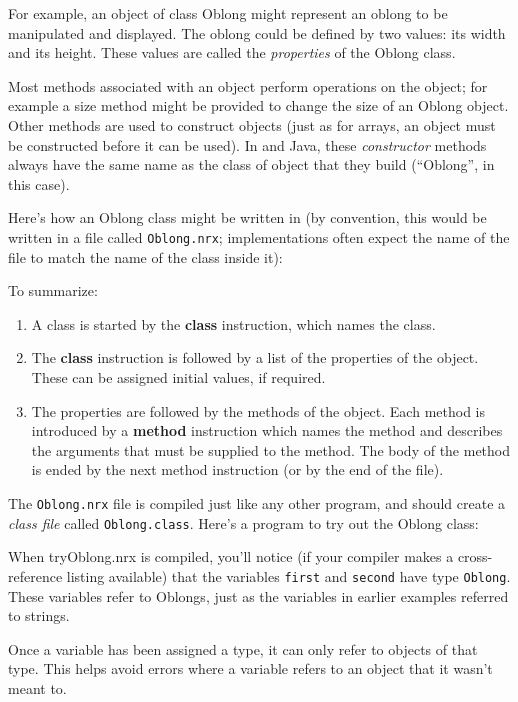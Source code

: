 For example, an object of class Oblong might represent an oblong to be manipulated and displayed. The oblong could be defined by two values: its width and its height. These values are called the \emph{properties} of the Oblong class.

Most methods associated with an object perform operations on the object; for example a size method might be provided to change the size of an Oblong object. Other methods are used to construct objects (just as for arrays, an object must be constructed before it can be used). In \nr{} and Java, these \emph{constructor} methods always have the same name as the class of object that they build (“Oblong”, in this case).

Here’s how an Oblong class might be written in \nr{} (by convention,
this would be written in a file called \texttt{Oblong.nrx}; implementations
often expect the name of the file to match the name of the class
inside it):

To summarize:
\begin{enumerate}
\item A class is started by the \textbf{class} instruction, which names the class.
\item The \textbf{class} instruction is followed by a list of the properties of the object. These can be assigned initial values, if required.
\item The properties are followed by the methods of the object. Each
method is introduced by a \textbf{method} instruction which names the method
and describes the arguments that must be supplied to the method. The
body of the method is ended by the next method instruction (or by the
end of the file).
\end{enumerate}
The \texttt{Oblong.nrx} file is compiled just like any other \nr{} program,
and should create a \emph{class file} called \texttt{Oblong.class}. Here’s a program
to try out the Oblong class:

When tryOblong.nrx is compiled, you’ll notice (if your compiler makes a cross-reference listing available) that the variables \texttt{first} and \texttt{second} have type \texttt{Oblong}. These variables refer to Oblongs, just as the variables in earlier examples referred to \nr{} strings.

Once a variable has been assigned a type, it can only refer to objects of that type. This helps avoid errors where a variable refers to an object that it wasn’t meant to.
